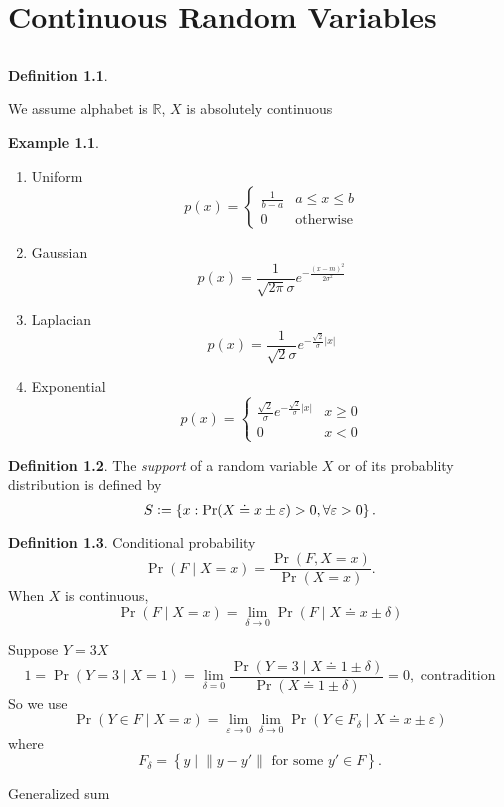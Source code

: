 \documentclass{report}
\newcommand{\R}{\mathbb{R}}
\newcommand{\set}[1]{\left\lbrace #1 \right\rbrace}
\newcommand{\norm}[1]{\left\| #1 \right\|}
\newcommand{\defeq}{\vcentcolon=}
\theoremstyle{definition}
\newtheorem{definition}{Definition}[section]
\newtheorem{example}{Example}[section]
\theoremstyle{remark}
\numberwithin{equation}{section}
\begin{document}
\chapter{Continuous Random Variables}

\section{}

\begin{definition}
  
\end{definition}
We assume alphabet is $\R$, $X$ is absolutely continuous

\begin{example}
  \begin{enumerate}
    \item Uniform \[p(x) = \begin{cases}
      \frac{1}{b-a} & a \leq x \leq b \\
      0 & \text{otherwise}
    \end{cases}\]
    \item Gaussian \[p(x) = \frac{1}{\sqrt{2\pi}\sigma}e^{-\frac{(x-m)^2}{2\sigma^2}}\]
    \item Laplacian \[p(x) = \frac{1}{\sqrt{2}\sigma}e^{-\frac{\sqrt{2}}{\sigma}|x|}\]
    \item Exponential \[p(x) = \begin{cases}
      \frac{\sqrt{2}}{\sigma}e^{-\frac{\sqrt{2}}{\sigma}|x|} & x \geq 0 \\
      0 & x < 0
    \end{cases}\]
  \end{enumerate}
\end{example}

\begin{definition}
  The \emph{support} of a random variable $X$ or of its probablity distribution is defined by \[S \defeq \set{x: \Pr(X \doteq x \pm \varepsilon) > 0, \forall \varepsilon>0}.\]
\end{definition}

\begin{definition}
  Conditional probability \[\Pr(F \mid X = x) = \frac{\Pr(F, X = x)}{\Pr(X = x)}.\]
  When $X$ is continuous, \[\Pr(F \mid X = x) = \lim_{\delta \to 0} \Pr(F \mid X \doteq x \pm \delta)\]
\end{definition}

Suppose $Y = 3X$ \[
  1 = \Pr(Y = 3 \mid X = 1) = \lim_{\delta = 0} \frac{\Pr(Y = 3 \mid X \doteq 1 \pm \delta)}{\Pr(X \doteq 1 \pm \delta)} = 0, \text{ contradition}
\]
So we use \[
  \Pr(Y \in F \mid X = x) = \lim_{\varepsilon \to 0} \lim_{\delta \to 0} \Pr(Y \in F_\delta \mid X \doteq x \pm \varepsilon) 
\] where \[
  F_\delta = \set{y \mid \norm{y - y'} \text{ for some } y' \in F}.
\]

Generalized sum 
\end{document}
